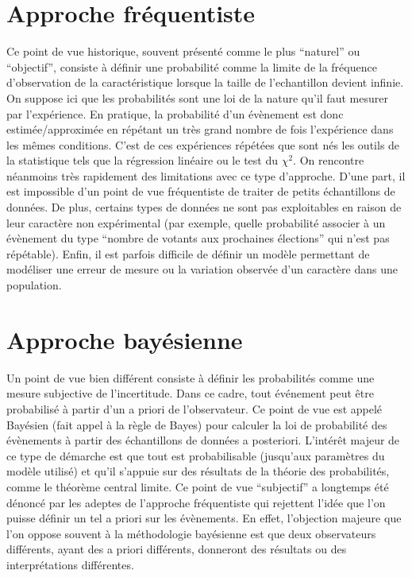 \documentclass[letterpaper,10pt,french]{sphinxmanual}
\begin{document}
\section{Approche fréquentiste}
\label{\detokenize{intro:approche-frequentiste}}
\sphinxAtStartPar
Ce point de vue historique, souvent présenté comme le plus “naturel” ou “objectif”, consiste à définir une probabilité comme la limite de la fréquence d’observation de la caractéristique lorsque la taille de l’echantillon devient infinie. On suppose ici que les probabilités sont une loi de la nature qu’il faut mesurer par l’expérience. En pratique, la probabilité d’un  évènement est donc estimée/approximée en répétant un très grand nombre de fois l’expérience dans les mêmes conditions. C’est de ces expériences répétées que sont nés les outils de la statistique tels que la régression linéaire ou le test du \(\chi^2\).
On rencontre néanmoins très rapidement des limitations avec ce type d’approche. D’une part, il est impossible d’un point de vue fréquentiste de traiter de petits échantillons de données. De plus, certains types de données ne sont
pas exploitables en raison de leur caractère non expérimental (par exemple, quelle probabilité associer à un évènement du type “nombre de votants aux prochaines élections” qui n’est pas répétable). Enfin, il est parfois difficile de définir un modèle  permettant de modéliser une erreur de mesure ou la variation observée d’un caractère dans une population.


\section{Approche bayésienne}
\label{\detokenize{intro:approche-bayesienne}}
\begin{sphinxShadowBox}

\sphinxAtStartPar
{}
\end{sphinxShadowBox}

\sphinxAtStartPar
Un point de vue bien différent consiste à définir les probabilités comme une mesure subjective de l’incertitude. Dans ce cadre, tout événement peut être probabilisé à partir d’un a priori de l’observateur. Ce point de vue est appelé Bayésien (fait appel à la règle de Bayes) pour calculer la loi de probabilité des évènements à partir des échantillons de données a posteriori. L’intérêt majeur de ce type de démarche est que tout est probabilisable (jusqu’aux paramètres du modèle utilisé) et qu’il s’appuie sur des résultats de la théorie des probabilités, comme le théorème central limite.
Ce point de vue “subjectif” a longtemps été dénoncé par les adeptes de l’approche fréquentiste qui rejettent l’idée que l’on puisse définir un tel a priori sur les évènements. En effet, l’objection majeure que l’on oppose souvent à la méthodologie bayésienne est que deux observateurs différents, ayant des a priori différents, donneront des résultats ou des interprétations différentes.
\end{document}
